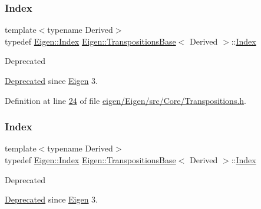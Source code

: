 \subsubsection{\texorpdfstring{Index}{Index}\hspace{0.1cm}{\footnotesize\ttfamily [1/2]}}
{\footnotesize\ttfamily template$<$typename Derived$>$ \\
typedef \hyperlink{namespace_eigen_a62e77e0933482dafde8fe197d9a2cfde}{Eigen\+::\+Index} \hyperlink{class_eigen_1_1_transpositions_base}{Eigen\+::\+Transpositions\+Base}$<$ Derived $>$\+::\hyperlink{class_eigen_1_1_transpositions_base_a3f5f06118b419e8e6ccbe49ed5b4c91f}{Index}}

\begin{DoxyRefDesc}{Deprecated}
\item[\hyperlink{deprecated__deprecated000008}{Deprecated}]since \hyperlink{namespace_eigen}{Eigen} 3. \end{DoxyRefDesc}


Definition at line \hyperlink{eigen_2_eigen_2src_2_core_2_transpositions_8h_source_l00024}{24} of file \hyperlink{eigen_2_eigen_2src_2_core_2_transpositions_8h_source}{eigen/\+Eigen/src/\+Core/\+Transpositions.\+h}.

\mbox{\label{class_eigen_1_1_transpositions_base_a3f5f06118b419e8e6ccbe49ed5b4c91f}} 
\subsubsection{\texorpdfstring{Index}{Index}\hspace{0.1cm}{\footnotesize\ttfamily [2/2]}}
{\footnotesize\ttfamily template$<$typename Derived$>$ \\
typedef \hyperlink{namespace_eigen_a62e77e0933482dafde8fe197d9a2cfde}{Eigen\+::\+Index} \hyperlink{class_eigen_1_1_transpositions_base}{Eigen\+::\+Transpositions\+Base}$<$ Derived $>$\+::\hyperlink{class_eigen_1_1_transpositions_base_a3f5f06118b419e8e6ccbe49ed5b4c91f}{Index}}

\begin{DoxyRefDesc}{Deprecated}
\item[\hyperlink{deprecated__deprecated000052}{Deprecated}]since \hyperlink{namespace_eigen}{Eigen} 3. \end{DoxyRefDesc}


